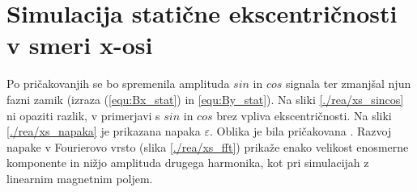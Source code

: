 \section{Simulacija statične ekscentričnosti v smeri x-osi}
Po pričakovanjih se bo spremenila amplituda $sin$ in $cos$ signala ter zmanjšal njun fazni zamik (izraza (\ref{equ:Bx_stat}) in \ref{equ:By_stat}). Na sliki \ref{./rea/xs_sincos} ni opaziti razlik, v primerjavi s $sin$ in $cos$ brez vpliva ekscentričnosti. Na sliki \ref{./rea/xs_napaka} je prikazana napaka $\varepsilon$. Oblika je bila pričakovana \cite{AM8192}. Razvoj napake v Fourierovo vrsto (slika \ref{./rea/xs_fft}) prikaže enako velikost enosmerne komponente in nižjo amplituda drugega harmonika, kot pri simulacijah z linearnim magnetnim poljem.
\newpage
